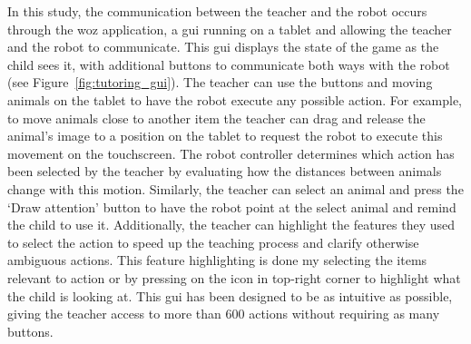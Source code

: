 In this study, the communication between the teacher and the robot occurs through the \gls{woz} application, a \gls{gui} running on a tablet and allowing the teacher and the robot to communicate. This \gls{gui} displays the state of the game as the child sees it, with additional buttons to communicate both ways with the robot (see Figure~\ref{fig:tutoring_gui}). The teacher can use the buttons and moving animals on the tablet to have the robot execute any possible action. For example, to move animals close to another item the teacher can drag and release the animal's image to a position on the tablet to request the robot to execute this movement on the touchscreen. The robot controller determines which action has been selected by the teacher by evaluating how the distances between animals change with this motion. Similarly, the teacher can select an animal and press the `Draw attention' button to have the robot point at the select animal and remind the child to use it.
Additionally, the teacher can highlight the features they used to select the action to speed up the teaching process and clarify otherwise ambiguous actions. This feature highlighting is done my selecting the items relevant to action or by pressing on the icon in top-right corner to highlight what the child is looking at.
This \gls{gui} has been designed to be as intuitive as possible, giving the teacher access to more than 600 actions without requiring as many buttons. %

